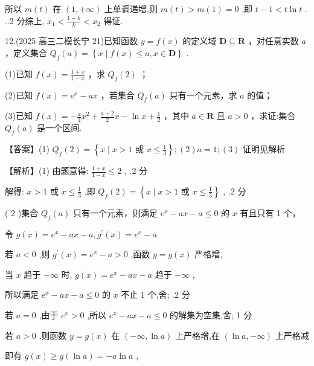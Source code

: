 \documentclass[10pt]{article}
\begin{document}
所以 \(m\left( t\right)\) 在 \(\left( {1, + \infty }\right)\) 上单调递增,则 \(m\left( t\right)  > m\left( 1\right)  = 0\) ,即 \(t - 1 < t\ln t\) . ..2 分综上, \({x}_{1} < \frac{1 + k}{k} < {x}_{2}\) 得证.

12.(2025 高三二模长宁 21)已知函数 \(y = f\left( x\right)\) 的定义域 \(\mathbf{D} \subseteq  \mathbf{R}\) ，对任意实数 \(a\) ，定义集合 \({Q}_{f}\left( a\right)  = \left\{  {x \mid  f\left( x\right)  \leq  a,x \in  \mathbf{D}}\right\}\) .

(1)已知 \(f\left( x\right)  = \frac{1 + x}{1 - x}\) ，求 \({Q}_{f}\left( 2\right)\) ；

(2)已知 \(f\left( x\right)  = {e}^{x} - {ax}\) ，若集合 \({Q}_{f}\left( a\right)\) 只有一个元素，求 \(a\) 的值；

(3)已知 \(f\left( x\right)  =  - \frac{a}{4}{x}^{2} + \frac{a + 2}{2}x - \ln x + \frac{1}{2}\) ，其中 \(a \in  \mathbf{R}\) 且 \(a > 0\) ，求证:集合 \({Q}_{f}\left( a\right)\) 是一个区间.

【答案】(1) \({Q}_{f}\left( 2\right)  = \left\{  {x \mid  x > 1\text{ 或 }x \leq  \frac{1}{3}}\right\}  ;\left( 2\right) a = 1;\left( 3\right)\) 证明见解析

【解析】(1) 由题意得: \(\frac{1 + x}{1 - x} \leq  2\) , .2 分

解得: \(x > 1\) 或 \(x \leq  \frac{1}{3}\) ,即 \({Q}_{f}\left( 2\right)  = \left\{  {x \mid  x > 1\text{ 或 }x \leq  \frac{1}{3}}\right\}\) , .2 分

( 2 )集合 \({Q}_{f}\left( a\right)\) 只有一个元素，则满足 \({e}^{x} - {ax} - a \leq  0\) 的 \(x\) 有且只有 1 个，

令 \(g\left( x\right)  = {e}^{x} - {ax} - a,{g}^{\prime }\left( x\right)  = {e}^{x} - a\)

若 \(a < 0\) ,则 \({g}^{\prime }\left( x\right)  = {e}^{x} - a > 0\) ,函数 \(y = g\left( x\right)\) 严格增,

当 \(x\) 趋于 \(- \infty\) 时, \(g\left( x\right)  = {e}^{x} - {ax} - a\) 趋于 \(- \infty\) ,

所以满足 \({e}^{x} - {ax} - a \leq  0\) 的 \(x\) 不止 1 个,舍; .2 分

若 \(a = 0\) ,由于 \({e}^{x} > 0\) ,所以 \({e}^{x} - {ax} - a \leq  0\) 的解集为空集,舍; 1 分

若 \(a > 0\) ,则函数 \(y = g\left( x\right)\) 在 \(\left( {-\infty ,\ln a}\right)\) 上严格增,在 \(\left( {\ln a, - \infty }\right)\) 上严格减

即有 \(g\left( x\right)  \geq  g\left( {\ln a}\right)  =  - a\ln a\) ,
\end{document}
